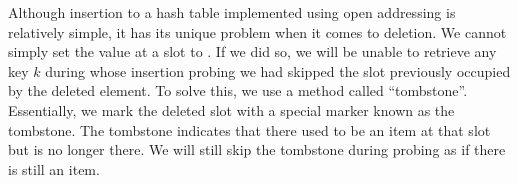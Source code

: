 Although insertion to a hash table implemented using open addressing is relatively simple, it has its unique problem when it comes to deletion. We cannot simply set the value at a slot to . If we did so, we will be unable to retrieve any key $k$ during whose insertion probing we had skipped the slot previously occupied by the deleted element. To solve this, we use a method called ``tombstone''. Essentially, we mark the deleted slot with a special marker  known as the tombstone. The tombstone indicates that there used to be an item at that slot but is no longer there. We will still skip the tombstone during probing as if there is still an item.